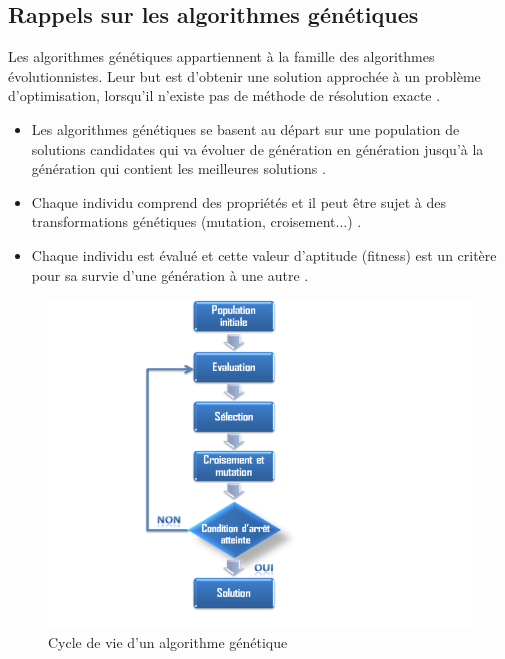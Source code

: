 \documentclass[12pt]{article}
\begin{document}

\subsection{Rappels sur les algorithmes génétiques}
\par Les algorithmes génétiques appartiennent à la famille des algorithmes évolutionnistes. Leur but est d'obtenir une solution approchée à un problème d'optimisation, lorsqu'il n'existe pas de méthode de résolution exacte \cite{algo_gen}.
\begin{itemize}[label=-]
\item Les algorithmes génétiques se basent au départ sur une population de solutions candidates qui va évoluer de génération en génération jusqu’à la génération qui contient les meilleures solutions \cite{algo_gen2}.
\item Chaque individu comprend des propriétés et il peut être sujet à des transformations génétiques (mutation, croisement...) \cite{algo_gen2}.
\item Chaque individu est évalué et cette valeur d’aptitude (fitness) est un critère pour sa survie d’une génération à une autre \cite{algo_gen2}.
\end{itemize}

\begin{figure}[H]
		\begin{center}
			\includegraphics[scale=0.4]{img/algo_genetique.png}
			\caption{Cycle de vie d'un algorithme génétique}
			\label{algo_genetique}
		\end{center}
\end{figure}
\end{document}
